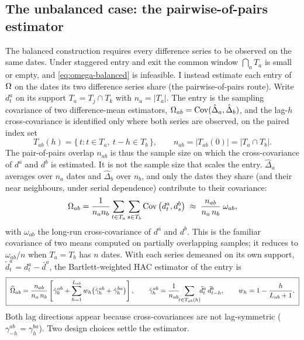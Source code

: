 \subsection{The unbalanced case: the pairwise-of-pairs estimator}
\label{sec:omega-unbal}

The balanced construction requires every difference series to be observed on the same
dates. Under staggered entry and exit the common window $\bigcap_a T_a$ is small or
empty, and \eqref{eq:omega-balanced} is infeasible. I instead estimate each entry of
$\Omega$ on the dates its two difference series share (the pairwise-of-pairs
route). Write $d^a_t$ on its support $T_a = T_j\cap T_k$ with $n_a=|T_a|$. The entry is
the sampling covariance of two difference-mean estimators,
$\Omega_{ab}=\operatorname{Cov}(\hat\Delta_a,\hat\Delta_b)$, and the lag-$h$ cross-covariance is
identified only where both series are observed, on the paired index set
\begin{equation}
  T_{ab}(h) = \{\, t : t\in T_a,\ t-h\in T_b \,\},
  \qquad
  n_{ab} = |T_{ab}(0)| = |T_a\cap T_b|.
\end{equation}
The pair-of-pairs overlap $n_{ab}$ is thus the sample size on which the cross-covariance
of $d^a$ and $d^b$ is estimated. It is not the sample size that scales the entry.
$\hat\Delta_a$ averages over $n_a$ dates and $\hat\Delta_b$ over $n_b$, and only the
dates they share (and their near neighbours, under serial dependence) contribute to
their covariance:
\begin{equation}
  \Omega_{ab}
  = \frac{1}{n_a n_b}\sum_{t\in T_a}\sum_{s\in T_b}\operatorname{Cov}\big(d^a_t,d^b_s\big)
  \;\approx\; \frac{n_{ab}}{n_a\,n_b}\;\omega_{ab},
  \label{eq:omega-scaling}
\end{equation}
with $\omega_{ab}$ the long-run cross-covariance of $d^a$ and $d^b$. This is the familiar
covariance of two means computed on partially overlapping samples; it reduces to
$\omega_{ab}/n$ when $T_a=T_b$ has $n$ dates. With each series demeaned on its own
support, $\tilde d^a_t = d^a_t - \bar d^a$, the Bartlett-weighted HAC estimator of the
entry is
\begin{equation}
  \boxed{\;
  \widehat{\Omega}_{ab}
  = \frac{n_{ab}}{n_a\,n_b}\left[\hat\gamma^{ab}_0
    + \sum_{h=1}^{L_{ab}} w_h\big(\hat\gamma^{ab}_h + \hat\gamma^{ba}_h\big)
    \right],
  \qquad
  \hat\gamma^{ab}_h
  = \frac{1}{n_{ab}}\!\!\sum_{t\in T_{ab}(h)}\!\! \tilde d^a_t\,\tilde d^b_{t-h},
  \qquad
  w_h = 1-\frac{h}{L_{ab}+1}.
  \;}
  \label{eq:omega-entry}
\end{equation}
Both lag directions appear because cross-covariances are not lag-symmetric
($\gamma^{ab}_{-h}=\gamma^{ba}_h$). Two design choices settle the estimator.


